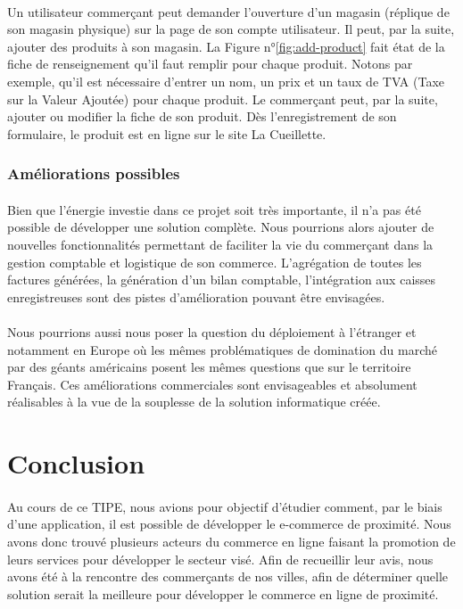 \documentclass[a4paper, 12pt]{article}
\begin{document}
\paragraph{}Un utilisateur commerçant peut demander l’ouverture d’un magasin (réplique de son magasin physique) sur la page de son compte utilisateur. Il peut, par la suite, ajouter des produits à son magasin.  La Figure n°\ref{fig:add-product} fait état de la fiche de renseignement qu’il faut remplir pour chaque produit. Notons par exemple, qu’il est nécessaire d’entrer un nom, un prix et un taux de TVA (Taxe sur la Valeur Ajoutée) pour chaque produit. Le commerçant peut, par la suite, ajouter ou modifier la fiche de son produit. Dès l’enregistrement de son formulaire, le produit est en ligne sur le site La Cueillette.

\subsubsection{Améliorations possibles}

\paragraph{}Bien que l’énergie investie dans ce projet soit très importante, il n’a pas été possible de développer une solution complète. Nous pourrions alors ajouter de nouvelles fonctionnalités permettant de faciliter la vie du commerçant dans la gestion comptable et logistique de son commerce. L’agrégation de toutes les factures générées, la génération d’un bilan comptable, l’intégration aux caisses enregistreuses sont des pistes d’amélioration pouvant être envisagées.
\paragraph{}Nous pourrions aussi nous poser la question du déploiement à l’étranger et notamment en Europe où les mêmes problématiques de domination du marché par des géants américains posent les mêmes questions que sur le territoire Français. Ces améliorations commerciales sont envisageables et absolument réalisables à la vue de la souplesse de la solution informatique créée.


\newpage
\section{Conclusion}

\paragraph{}Au cours de ce TIPE, nous avions pour objectif d’étudier comment, par le biais d’une application, il est possible de développer le e-commerce de proximité. Nous avons donc trouvé plusieurs acteurs du commerce en ligne faisant la promotion de leurs services pour développer le secteur visé. Afin de recueillir leur avis, nous avons été à la rencontre des commerçants de nos villes, afin de déterminer quelle solution serait la meilleure pour développer le commerce en ligne de proximité.
\end{document}
